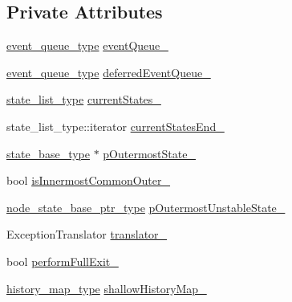 \subsection*{Private Attributes}
\begin{DoxyCompactItemize}
\item 
\mbox{\hyperlink{classboost_1_1statechart_1_1state__machine_a308a12082f9cd10b95118871f01e94da}{event\+\_\+queue\+\_\+type}} \mbox{\hyperlink{classboost_1_1statechart_1_1state__machine_a54523308f4c5c8aae7fb68cf684e9ba4}{event\+Queue\+\_\+}}
\item 
\mbox{\hyperlink{classboost_1_1statechart_1_1state__machine_a308a12082f9cd10b95118871f01e94da}{event\+\_\+queue\+\_\+type}} \mbox{\hyperlink{classboost_1_1statechart_1_1state__machine_a86145bf7f1229a0f481348a61a3bc3c4}{deferred\+Event\+Queue\+\_\+}}
\item 
\mbox{\hyperlink{classboost_1_1statechart_1_1state__machine_afe501a67ddcd1da38728f6c672b57198}{state\+\_\+list\+\_\+type}} \mbox{\hyperlink{classboost_1_1statechart_1_1state__machine_a9deab0444eeb25aeb8451bd6a62ec645}{current\+States\+\_\+}}
\item 
state\+\_\+list\+\_\+type\+::iterator \mbox{\hyperlink{classboost_1_1statechart_1_1state__machine_af4f0ac6b55e17e5f88e6bd7177ee6175}{current\+States\+End\+\_\+}}
\item 
\mbox{\hyperlink{classboost_1_1statechart_1_1state__machine_a69cc258c29fcabec25c5dc8bedb7d530}{state\+\_\+base\+\_\+type}} $\ast$ \mbox{\hyperlink{classboost_1_1statechart_1_1state__machine_a00e489e60fee093aea3de451e0f32358}{p\+Outermost\+State\+\_\+}}
\item 
bool \mbox{\hyperlink{classboost_1_1statechart_1_1state__machine_a36642a513713885561837d85a0f7085f}{is\+Innermost\+Common\+Outer\+\_\+}}
\item 
\mbox{\hyperlink{classboost_1_1statechart_1_1state__machine_a5d90f1176309ec8307979aa79dd6f4a3}{node\+\_\+state\+\_\+base\+\_\+ptr\+\_\+type}} \mbox{\hyperlink{classboost_1_1statechart_1_1state__machine_a4337bcc933d4af38b1a33424eef94e76}{p\+Outermost\+Unstable\+State\+\_\+}}
\item 
Exception\+Translator \mbox{\hyperlink{classboost_1_1statechart_1_1state__machine_adbb6619d6e1365b97f08a0558f3e0821}{translator\+\_\+}}
\item 
bool \mbox{\hyperlink{classboost_1_1statechart_1_1state__machine_a9ae64cb7ef7369c8a29cf86fb8a6daf9}{perform\+Full\+Exit\+\_\+}}
\item 
\mbox{\hyperlink{classboost_1_1statechart_1_1state__machine_a9b8fdd7b5af3b0c9143f9d6fb4036ff7}{history\+\_\+map\+\_\+type}} \mbox{\hyperlink{classboost_1_1statechart_1_1state__machine_a799d498bd7ae723b79188f0316c38bbf}{shallow\+History\+Map\+\_\+}}

\end{DoxyCompactItemize}

